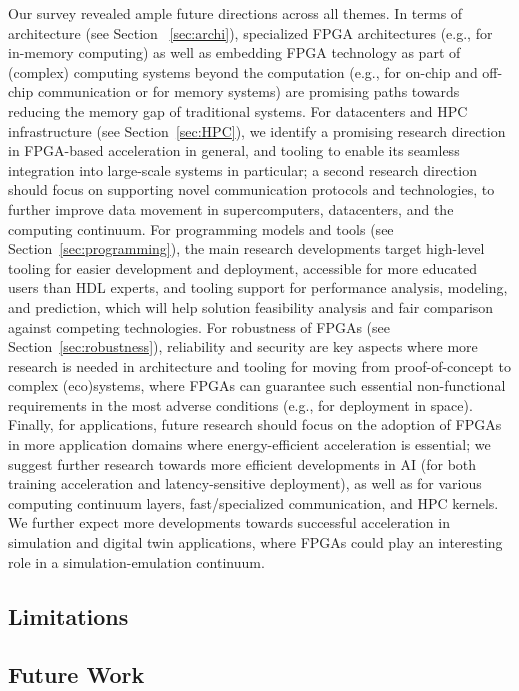 Our survey revealed ample future directions across all themes. In terms of architecture (see Section ~\ref{sec:archi}), specialized FPGA architectures (e.g., for in-memory computing) as well as embedding FPGA technology as part of (complex) computing systems beyond the computation (e.g., for on-chip and off-chip communication or for memory systems) are  promising paths towards reducing the memory gap of traditional systems. For datacenters and HPC infrastructure (see Section~\ref{sec:HPC}), we identify a promising research direction in FPGA-based acceleration in general, and tooling to enable its seamless integration into large-scale systems in particular; a second research direction should focus on supporting novel communication protocols and technologies, to further improve data movement in supercomputers, datacenters, and the computing continuum. For programming models and tools (see Section~\ref{sec:programming}), the main research developments target high-level tooling for easier development and deployment, accessible for more educated users than HDL experts, and tooling support for performance analysis, modeling, and prediction, which will help solution feasibility analysis and fair comparison against competing technologies. For robustness of FPGAs (see Section~\ref{sec:robustness}), reliability and security are key aspects where more research is needed in architecture and tooling for moving from proof-of-concept to complex (eco)systems, where FPGAs can guarantee such essential non-functional requirements in the most adverse conditions (e.g., for deployment in space). Finally, for applications, future research should focus on the adoption of FPGAs in more application domains where energy-efficient acceleration is essential; we suggest further research towards more efficient developments in AI (for both training acceleration and latency-sensitive deployment), as well as for various computing continuum layers, fast/specialized communication, and HPC kernels. We further expect more developments towards successful acceleration in simulation and digital twin applications, where FPGAs could play an interesting role in a simulation-emulation continuum.     

\subsection{Limitations}


\subsection{Future Work}
   
